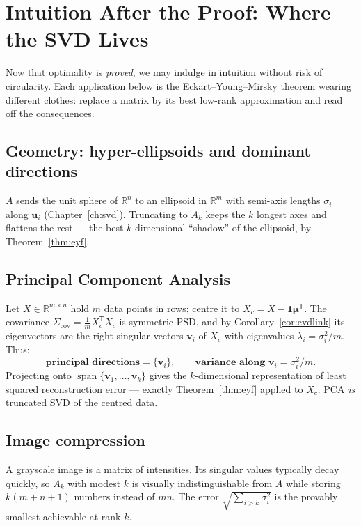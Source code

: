 \documentclass[11pt,oneside]{book}
\theoremstyle{plain}
\theoremstyle{definition}
\theoremstyle{remark}
\newcommand{\R}{\mathbb{R}}
\newcommand{\spn}{\operatorname{span}}
\newcommand{\T}{^{\mathsf T}}
\newcommand{\bu}{\mathbf{u}}
\newcommand{\bv}{\mathbf{v}}
\newcommand{\bmu}{\boldsymbol{\mu}}
\begin{document}
\chapter{Intuition After the Proof: Where the SVD Lives}\label{ch:intuition}

\begin{intuition_box}
Now that optimality is \emph{proved}, we may indulge in intuition without risk of
circularity. Each application below is the Eckart--Young--Mirsky theorem wearing
different clothes: replace a matrix by its best low-rank approximation and read off the
consequences.
\end{intuition_box}

\section{Geometry: hyper-ellipsoids and dominant directions}
$A$ sends the unit sphere of $\R^n$ to an ellipsoid in $\R^m$ with semi-axis lengths
$\sigma_i$ along $\bu_i$ (Chapter~\ref{ch:svd}). Truncating to $A_k$ keeps the $k$
longest axes and flattens the rest --- the best $k$-dimensional ``shadow'' of the
ellipsoid, by Theorem~\ref{thm:eyf}.

\section{Principal Component Analysis}
Let $X\in\R^{m\times n}$ hold $m$ data points in rows; centre it to $X_c=X-\mathbf 1\bmu\T$.
The covariance $\Sigma_{\mathrm{cov}}=\tfrac1m X_c\T X_c$ is symmetric PSD, and by
Corollary~\ref{cor:evdlink} its eigenvectors are the right singular vectors $\bv_i$ of
$X_c$ with eigenvalues $\lambda_i=\sigma_i^2/m$. Thus:
\[
\textbf{principal directions}=\{\bv_i\},\qquad
\textbf{variance along }\bv_i=\sigma_i^2/m .
\]
Projecting onto $\spn\{\bv_1,\dots,\bv_k\}$ gives the $k$-dimensional representation of
least squared reconstruction error --- exactly Theorem~\ref{thm:eyf} applied to $X_c$.
PCA \emph{is} truncated SVD of the centred data.

\section{Image compression}
A grayscale image is a matrix of intensities. Its singular values typically decay
quickly, so $A_k$ with modest $k$ is visually indistinguishable from $A$ while storing
$k(m+n+1)$ numbers instead of $mn$. The error $\sqrt{\sum_{i>k}\sigma_i^2}$ is the
provably smallest achievable at rank $k$.
\end{document}
